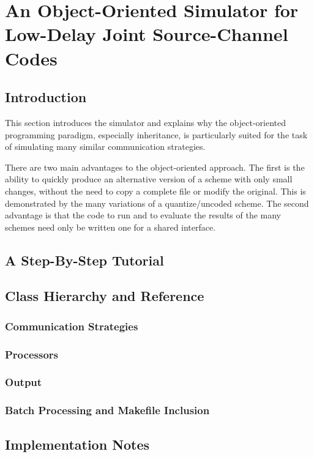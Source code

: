 \chapter[A Simulator for Joint Source-Channel Codes]%
{An Object-Oriented Simulator for Low-Delay Joint Source-Channel Codes}

\section{Introduction}

This section introduces the simulator and explains why the object-oriented
programming paradigm, especially inheritance, is particularly suited for the
task of simulating many similar communication strategies.

There are two main advantages to the object-oriented approach. The first is the
ability to quickly produce an alternative version of a scheme with only small
changes, without the need to copy a complete file or modify the original. This
is demonstrated by the many variations of a quantize/uncoded scheme. The second
advantage is that the code to run and to evaluate the results of the many
schemes need only be written one for a shared interface. 


\section{A Step-By-Step Tutorial}


\section{Class Hierarchy and Reference}

\subsection{Communication Strategies}

\subsection{Processors}

\subsection{Output}

\subsection{Batch Processing and Makefile Inclusion}


\section{Implementation Notes}
